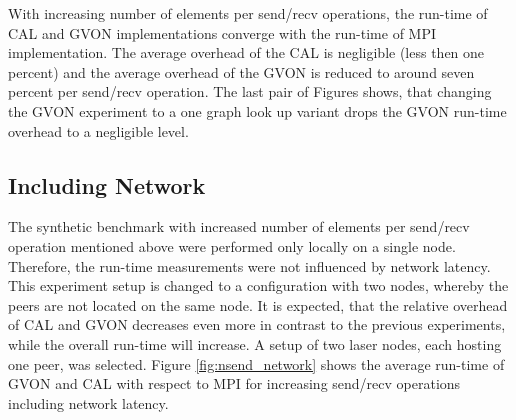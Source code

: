 \noindent With increasing number of elements per send/recv operations,
the run-time of CAL and GVON implementations converge with the
run-time of MPI implementation. The average overhead of the CAL is
negligible (less then one percent) and the average overhead of the
GVON is reduced to around seven percent per send/recv operation. The
last pair of Figures shows, that changing the GVON experiment to a one
graph look up variant drops the GVON run-time overhead to a negligible
level.

\subsection*{Including Network}
The synthetic benchmark with increased number of elements per
send/recv operation mentioned above were performed only locally on a
single node.  Therefore, the run-time measurements were not influenced
by network latency.  This experiment setup is changed to a
configuration with two nodes, whereby the peers are not located on the
same node. It is expected, that the relative overhead of CAL and GVON
decreases even more in contrast to the previous experiments, while the
overall run-time will increase.  A setup of two laser nodes, each
hosting one peer, was selected.  Figure \ref{fig:nsend_network} shows
the average run-time of GVON and CAL with respect to MPI for
increasing send/recv operations including network latency.

